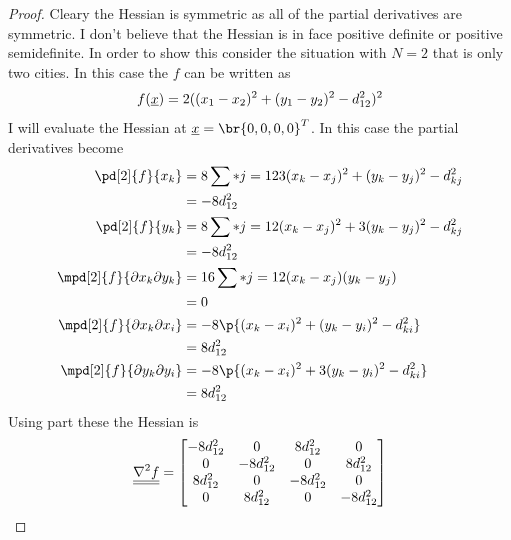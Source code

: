 \documentclass[11pt, oneside]{article}
\begin{document}
\begin{enumerate}
\begin{enumerate}
        \begin{proof}
          Cleary the Hessian is symmetric as all of the partial derivatives
          are symmetric.
          I don't believe that the Hessian is in face positive definite
          or positive semidefinite.
          In order to show this consider the situation with $N = 2$ that is only
          two cities.
          In this case the $f$ can be written as
          \[
            f(\underline{x}) = 2((x_1 - x_2)^2 + (y_1 - y_2)^2 - d_{12}^2)^2
          \]
          I will evaluate the Hessian at $\v{x} = \br{0, 0, 0, 0}^T$.
          In this case the partial derivatives become
          \begin{align*}
            \pd[2]{f}{x_k} &= 8 \sum*{j = 1}{2}{3(x_k - x_j)^2 + (y_k - y_j)^2 - d_{kj}^2} \\
            &= -8d_{12}^2 \\
            \pd[2]{f}{y_k} &= 8 \sum*{j = 1}{2}{(x_k - x_j)^2 + 3(y_k - y_j)^2 - d_{kj}^2} \\
            &= -8d_{12}^2 \\
            \mpd[2]{f}{\partial x_k \partial y_k} &= 16 \sum*{j = 1}{2}{(x_k - x_j)(y_k - y_j)} \\
            &= 0 \\
            \mpd[2]{f}{\partial x_k \partial x_i} &= -8\p{(x_k - x_i)^2 + (y_k - y_i)^2 - d_{ki}^2} \\
            &= 8d_{12}^2 \\
            \mpd[2]{f}{\partial y_k \partial y_i} &= -8 \p{(x_k - x_i)^2 + 3(y_k - y_i)^2 - d_{ki}^2} \\
            &= 8d_{12}^2
          \end{align*}
          Using part these the Hessian is
          \begin{align*}
            \underline{\underline{\nabla^2 f}} =
            \begin{bmatrix}
              -8d_{12}^2 & 0 & 8d_{12}^2 & 0 \\
              0 & -8d_{12}^2 & 0 & 8d_{12}^2 \\
              8d_{12}^2 & 0 & -8d_{12}^2 & 0 \\
              0 & 8d_{12}^2 & 0 & -8d_{12}^2
            \end{bmatrix}
          \end{align*}


\end{proof}
\end{enumerate}
\end{enumerate}
\end{document}

